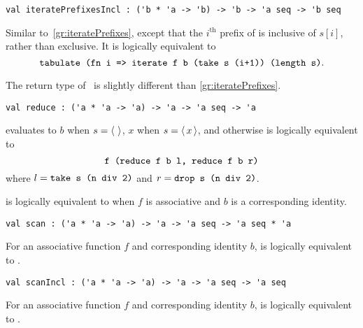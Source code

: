 \begin{flex}
\begin{gram}[iteratePrefixesIncl]
\label{gr:iteratePrefixesIncl}
\begin{verbatim}
val iteratePrefixesIncl : ('b * 'a -> 'b) -> 'b -> 'a seq -> 'b seq
\end{verbatim}
Similar to~\ref{gr:iteratePrefixes}, except that the $i^\text{th}$ prefix of
 is inclusive of $s[i]$, rather than exclusive.
It is logically equivalent to
\[
  \texttt{tabulate (fn i => iterate f b (take s (i+1)) (length s)}.
\]
\end{gram}
\begin{note}
The return type of~ is slightly different than
\ref{gr:iteratePrefixes}.
\end{note}
\end{flex}

\begin{flex}
\begin{gram}[reduce]
\label{gr:reduce}
\begin{verbatim}
val reduce : ('a * 'a -> 'a) -> 'a -> 'a seq -> 'a
\end{verbatim}
 evaluates to $b$ when $s = \left\langle\,  \,\right\rangle$,
$x$ when $s = \left\langle\, x \,\right\rangle$, and otherwise is logically equivalent to
\[
  \texttt{f (reduce f b l, reduce f b r)}
\]
where $l = \texttt{take s (n div 2)}$ and $r = \texttt{drop s (n div 2)}$.
\end{gram}
\begin{note}
 is logically equivalent to  when
$f$ is associative and $b$ is a corresponding identity.
\end{note}
\end{flex}

\begin{gram}[scan]
\label{gr:scan}
\begin{verbatim}
val scan : ('a * 'a -> 'a) -> 'a -> 'a seq -> 'a seq * 'a
\end{verbatim}
For an associative function $f$ and corresponding identity $b$, 
is logically equivalent to .
\end{gram}

\begin{gram}[scanIncl]
\label{gr:scanIncl}
\begin{verbatim}
val scanIncl : ('a * 'a -> 'a) -> 'a -> 'a seq -> 'a seq
\end{verbatim}
For an associative function $f$ and corresponding identity $b$, 
is logically equivalent to .
\end{gram}

